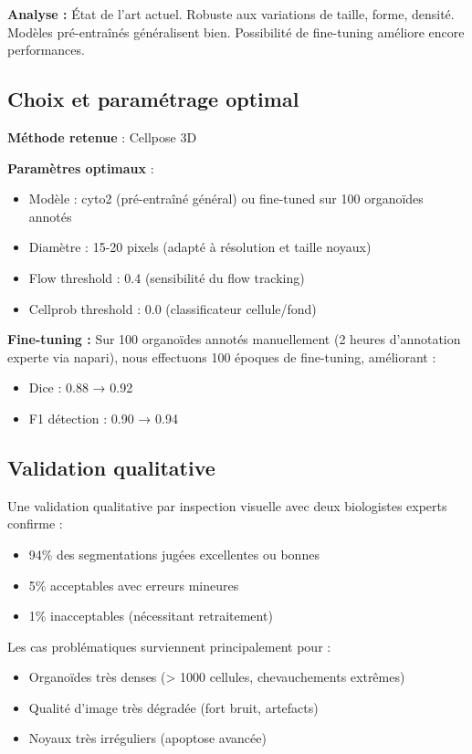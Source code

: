 \textbf{Analyse :}
État de l'art actuel. Robuste aux variations de taille, forme, densité. Modèles pré-entraînés généralisent bien. Possibilité de fine-tuning améliore encore performances.

\subsection{Choix et paramétrage optimal}

\textbf{Méthode retenue} : Cellpose 3D

\textbf{Paramètres optimaux} :
\begin{itemize}
    \item Modèle : cyto2 (pré-entraîné général) ou fine-tuned sur 100 organoïdes annotés
    \item Diamètre : 15-20 pixels (adapté à résolution et taille noyaux)
    \item Flow threshold : 0.4 (sensibilité du flow tracking)
    \item Cellprob threshold : 0.0 (classificateur cellule/fond)
\end{itemize}

\textbf{Fine-tuning :}
Sur 100 organoïdes annotés manuellement (2 heures d'annotation experte via napari), nous effectuons 100 époques de fine-tuning, améliorant :
\begin{itemize}
    \item Dice : 0.88 → 0.92
    \item F1 détection : 0.90 → 0.94
\end{itemize}

\subsection{Validation qualitative}

Une validation qualitative par inspection visuelle avec deux biologistes experts confirme :
\begin{itemize}
    \item 94\% des segmentations jugées excellentes ou bonnes
    \item 5\% acceptables avec erreurs mineures
    \item 1\% inacceptables (nécessitant retraitement)
\end{itemize}

Les cas problématiques surviennent principalement pour :
\begin{itemize}
    \item Organoïdes très denses (> 1000 cellules, chevauchements extrêmes)
    \item Qualité d'image très dégradée (fort bruit, artefacts)
    \item Noyaux très irréguliers (apoptose avancée)
\end{itemize}

